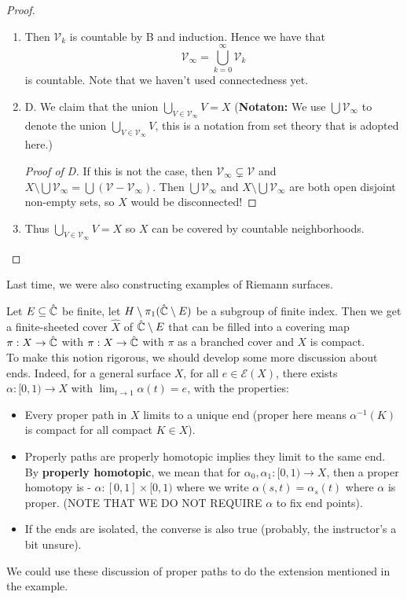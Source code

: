 \documentclass{article}
\begin{document}
\begin{proof}
\begin{enumerate}
    \item Then $\mathcal{V}_k$ is countable by B and induction. Hence we have that
    \[\mathcal{V}_\infty = \bigcup_{k = 0}^\infty \mathcal{V}_k\]
    is countable. Note that we haven't used connectedness yet.
    \item D. We claim that the union $\bigcup_{V \in \mathcal{V}_\infty} V = X$ (\textbf{Notaton:} We use $\bigcup \mathcal{V}_\infty$ to denote the union $\bigcup_{V \in \mathcal{V}_\infty} V$, this is a notation from set theory that is adopted here.) 
    \begin{proof}[Proof of D]
        If this is not the case, then $\mathcal{V}_\infty \subsetneq \mathcal{V}$ and $X \setminus \bigcup \mathcal{V}_\infty = \bigcup (\mathcal{V} - \mathcal{V}_\infty)$. Then $\bigcup \mathcal{V}_\infty$ and $X \setminus \bigcup \mathcal{V}_\infty$ are both open disjoint non-empty sets, so $X$ would be disconnected!
    \end{proof}
    \item Thus $\bigcup_{V \in \mathcal{V}_\infty} V = X$ so $X$ can be covered by countable neighborhoods.
\end{enumerate}
\end{proof}

Last time, we were also constructing examples of Riemann surfaces.
\begin{example}
    Let $E \subseteq \hat{\mathbb{C}}$ be finite, let $H \setminus \pi_1(\hat{\mathbb{C}} \setminus E)$ be a subgroup of finite index. Then we get a finite-sheeted cover $\hat{X}$ of $\hat{\mathbb{C}} \setminus E$ that can be filled into a covering map $\pi: X \to \hat{\mathbb{C}}$ with $\pi: X \to \hat{\mathbb{C}}$ with $\pi$ as a branched cover and $X$ is compact.\\

    To make this notion rigorous, we should develop some more discussion about ends. Indeed, for a general surface $X$, for all $e \in \mathcal{E}(X)$, there exists $\alpha: [0, 1) \to X$ with $\lim_{t \to 1} \alpha(t) = e$, with the properties:
    \begin{itemize}
        \item Every proper path in $X$ limits to a unique end (proper here means $\alpha^{-1}(K)$ is compact for all compact $K \in X$). 
        \item Properly paths are properly homotopic implies they limit to the same end. By \textbf{properly homotopic}, we mean that for $\alpha_0, \alpha_1: [0, 1) \to X$, then a proper homotopy is - $\alpha: [0, 1] \times [0, 1)$ where we write $\alpha(s, t) = \alpha_s(t)$ where $\alpha$ is proper. (NOTE THAT WE DO NOT REQUIRE $\alpha$ to fix end points). 
        \item If the ends are isolated, the converse is also true (probably, the instructor's a bit unsure).
    \end{itemize}
    We could use these discussion of proper paths to do the extension mentioned in the example.
\end{example}
\end{document}
